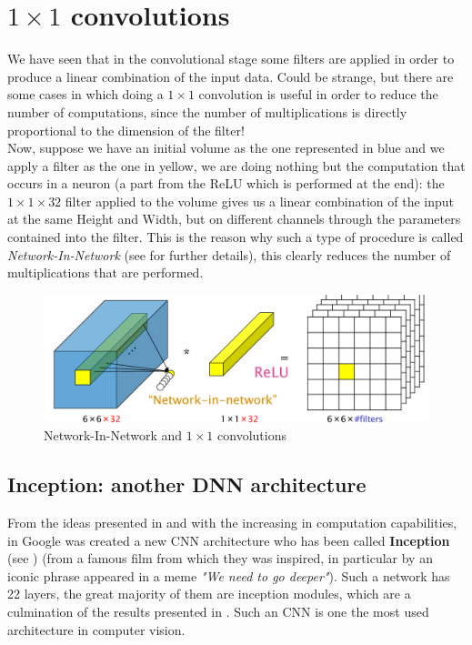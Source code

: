 \section{${1}\times{1}$ convolutions}
We have seen that in the convolutional stage some filters are applied in order to produce a linear combination of the input data. Could be strange, but there are some cases in which doing a $1\times{1}$ convolution is useful in order to reduce the number of computations, since the number of multiplications is directly proportional to the dimension of the filter! \\
Now, suppose we have an initial volume as the one represented in blue and we apply a filter as the one in yellow, we are doing nothing but the computation that occurs in a neuron (a part from the ReLU which is performed at the end): the $1{\times}{1}\times{32}$ filter applied to the volume gives us a linear combination of the input at the same Height and Width, but on different channels through the parameters contained into the filter. This is the reason why such a type of procedure is called \textit{Network-In-Network} (see \cite{NetInNet} for further details), this clearly reduces the number of multiplications that are performed.

\begin{figure}[h]
    \centering
    \includegraphics[scale=0.6]{img/NiN.png}
    \caption{Network-In-Network and $1{\times}{1}$ convolutions}
\end{figure}


\subsection{Inception: another DNN architecture}
From the ideas presented in \cite{NetInNet} and with the increasing in computation capabilities, in Google was created a new CNN architecture who has been called \textbf{Inception} (see \cite{Inception}) (from a famous film from which they was inspired, in particular by an iconic phrase appeared in a meme \textit{"We need to go deeper"}). Such a network has 22 layers, the great majority of them are inception modules, which are a culmination of the results presented in \cite{NetInNet}. Such an CNN is one the most used  architecture in computer vision.

